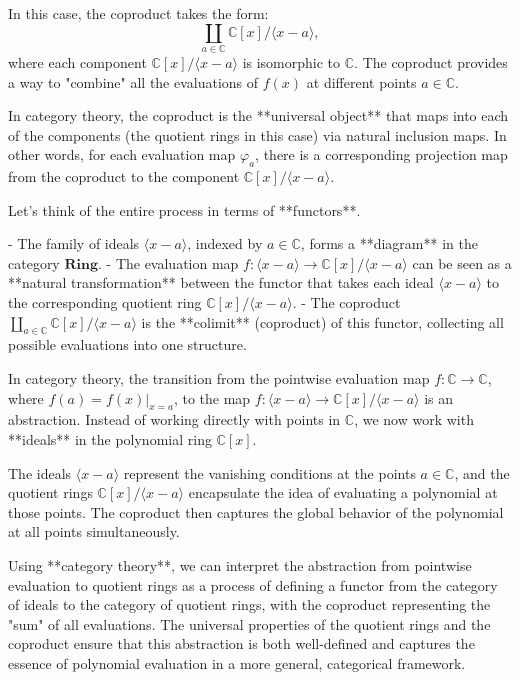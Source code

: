 \documentclass[11pt,openany]{article}
\begin{document}
In this case, the coproduct takes the form:
\[
\coprod_{a \in \mathbb{C}} \mathbb{C}[x] / \langle x - a \rangle,
\]
where each component \( \mathbb{C}[x] / \langle x - a \rangle \) is isomorphic to \( \mathbb{C} \). The coproduct provides a way to "combine" all the evaluations of \( f(x) \) at different points \( a \in \mathbb{C} \).

In category theory, the coproduct is the **universal object** that maps into each of the components (the quotient rings in this case) via natural inclusion maps. In other words, for each evaluation map \( \varphi_a \), there is a corresponding projection map from the coproduct to the component \( \mathbb{C}[x] / \langle x - a \rangle \).


Let’s think of the entire process in terms of **functors**.

- The family of ideals \( \langle x - a \rangle \), indexed by \( a \in \mathbb{C} \), forms a **diagram** in the category \( \mathbf{Ring} \).
- The evaluation map \( f: \langle x - a \rangle \to \mathbb{C}[x] / \langle x - a \rangle \) can be seen as a **natural transformation** between the functor that takes each ideal \( \langle x - a \rangle \) to the corresponding quotient ring \( \mathbb{C}[x] / \langle x - a \rangle \).
- The coproduct \( \coprod_{a \in \mathbb{C}} \mathbb{C}[x] / \langle x - a \rangle \) is the **colimit** (coproduct) of this functor, collecting all possible evaluations into one structure.


In category theory, the transition from the pointwise evaluation map \( f: \mathbb{C} \to \mathbb{C} \), where \( f(a) = f(x) \big|_{x=a} \), to the map \( f: \langle x - a \rangle \to \mathbb{C}[x] / \langle x - a \rangle \) is an abstraction. Instead of working directly with points in \( \mathbb{C} \), we now work with **ideals** in the polynomial ring \( \mathbb{C}[x] \).

The ideals \( \langle x - a \rangle \) represent the vanishing conditions at the points \( a \in \mathbb{C} \), and the quotient rings \( \mathbb{C}[x] / \langle x - a \rangle \) encapsulate the idea of evaluating a polynomial at those points. The coproduct then captures the global behavior of the polynomial at all points simultaneously.


Using **category theory**, we can interpret the abstraction from pointwise evaluation to quotient rings as a process of defining a functor from the category of ideals to the category of quotient rings, with the coproduct representing the "sum" of all evaluations. The universal properties of the quotient rings and the coproduct ensure that this abstraction is both well-defined and captures the essence of polynomial evaluation in a more general, categorical framework.
\end{document}
